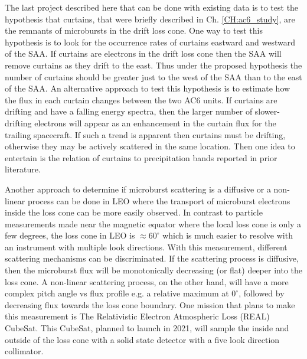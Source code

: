 The last project described here that can be done with existing data is to test the hypothesis that curtains, that were briefly described in Ch. \ref{CH:ac6_study}, are the remnants of microbursts in the drift loss cone. One way to test this hypothesis is to look for the occurrence rates of curtains eastward and westward of the SAA. If curtains are electrons in the drift loss cone then the SAA will remove curtains as they drift to the east. Thus under the proposed hypothesis the number of curtains should be greater just to the west of the SAA than to the east of the SAA. An alternative approach to test this hypothesis is to estimate how the flux in each curtain changes between the two AC6 units. If curtains are drifting and have a falling energy spectra, then the larger number of slower-drifting electrons will appear as an enhancement in the curtain flux for the trailing spacecraft. If such a trend is apparent then curtains must be drifting, otherwise they may be actively scattered in the same location. Then one idea to entertain is the relation of curtains to precipitation bands reported in prior literature.

Another approach to determine if microburst scattering is a diffusive or a non-linear process can be done in LEO where the transport of microburst electrons inside the loss cone can be more easily observed. In contrast to particle measurements made near the magnetic equator where the local loss cone is only a few degrees, the loss cone in LEO is $\approx 60^\circ$ which is much easier to resolve with an instrument with multiple look directions. With this measurement, different scattering mechanisms can be discriminated. If the scattering process is diffusive, then the microburst flux will be monotonically decreasing (or flat) deeper into the loss cone. A non-linear scattering process, on the other hand, will have a more complex pitch angle vs flux profile e.g. a relative maximum at $0^\circ$, followed by decreasing flux towards the loss cone boundary. One mission that plans to make this measurement is The Relativistic Electron Atmospheric Loss (REAL) CubeSat. This CubeSat, planned to launch in 2021, will sample the inside and outside of the loss cone with a solid state detector with a five look direction collimator.

